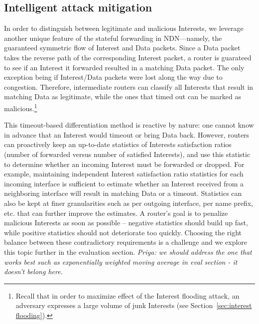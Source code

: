 
\subsection{Intelligent attack mitigation}
\label{sec:intelligent mitigating}


In order to distinguish between legitimate and malicious Interests, we leverage another unique feature of the stateful forwarding in NDN---namely, the guaranteed symmetric flow of Interest and Data packets. Since a Data packet takes the reverse path of the corresponding Interest packet, a router is guarateed to see if an Interest it forwarded resulted in a matching Data packet. The only exception being if Interest/Data packets were lost along the way due to congestion.
Therefore, intermediate routers can classify all Interests that result in matching Data as legitimate, while the ones that timed out can be marked as malicious.\footnote{Recall that in order to maximize effect of the Interest flooding attack, an adversary expresses a large volume of junk Interests (see Section~\ref{sec:interest flooding}).}  

This timeout-based differentiation method is reactive by nature: one cannot know in advance that an Interest would timeout or bring Data back. However, routers can proactively keep an up-to-date statistics of Interests satisfaction ratios (number of forwarded versus number of satisfied Interests), and use this statistic to determine whether an incoming Interest must be forwarded or dropped. For example, maintaining independent Interest satisfaction ratio statistics for each incoming interface is sufficient to estimate whether an Interest received from a neighboring interface will result in matching Data or a timeout. Statistics can also be kept at finer granularities such as per outgoing interface, per name prefix, etc. that can further improve the estimates. A router's goal is to penalize malicious Interests as soon as possible -- negative statistics should build up fast, while positive statistics should not deteriorate too quickly. Choosing the right balance between these contradictory requirements is a challenge and we explore this topic further  in the evaluation section.  {\it Priya: we should address the one that works best such as exponentially weighted moving average in eval section - it doesn't belong here.} 

